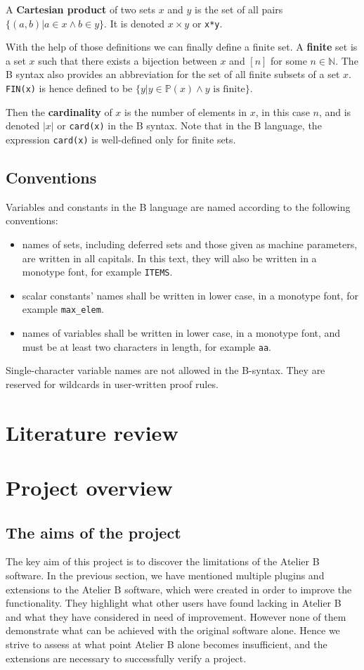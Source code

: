 \documentclass[11pt,journal]{IEEEtran}
\begin{document}
	A \textbf{Cartesian product} of two sets $x$ and $y$ is the set of all pairs $\{(a,b) | a \in x \wedge b \in y  \}$. It is denoted $x \times y$ or \texttt{x*y}.
	
	With the help of those definitions we can finally define a finite set. A \textbf{finite} set is a set $x$ such that there exists a bijection between $x$ and $[n]$ for some $n \in \mathbb{N}$.  The B syntax also provides an abbreviation for the set of all finite subsets of a set $x$. \texttt{FIN(x)} is hence defined to be $\{y| y \in \mathbb{P}(x) \wedge y \text{ is finite} \}$.
	
	Then the \textbf{cardinality} of $x$ is the number of elements in $x$, in this case $n$, and is denoted $|x|$ or \texttt{card(x)} in the B syntax. Note that in the B language, the expression \texttt{card(x)} is well-defined only for finite sets.
	
	\subsection{Conventions}
	
	Variables and constants in the B language are named according to the following conventions:
	\begin{itemize}
		\item names of sets, including deferred sets and those given as machine parameters, are written in all capitals. In this text, they will also be written in a monotype font, for example \texttt{ITEMS}.
		\item scalar constants' names shall be written in lower case, in a monotype font, for example \texttt{max\_elem}.
		\item names of variables shall be written in lower case, in a monotype font, and must be at least two characters in length, for example \texttt{aa}.
	\end{itemize}
	Single-character variable names are not allowed in the B-syntax. They are reserved for wildcards in user-written proof rules.
	
	\section{Literature review}

	\section{Project overview}
	\subsection{The aims of the project}
	The key aim of this project is to discover the limitations of the Atelier B software. In the previous section, we have mentioned multiple plugins and extensions to the Atelier B software, which were created in order to improve the functionality. They highlight what other users have found lacking in Atelier B and what they have considered in need of improvement. However none of them demonstrate what can be achieved with the original software alone. Hence we strive to assess at what point Atelier B alone becomes insufficient, and the extensions are necessary to successfully verify a project. 
		
\end{document}
